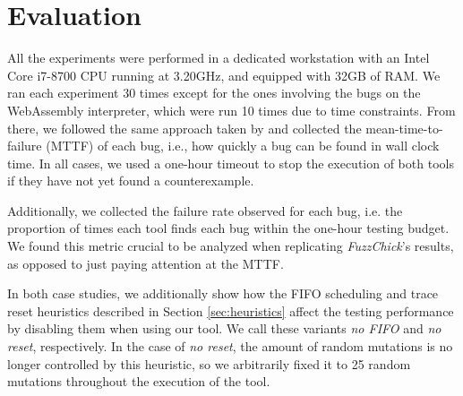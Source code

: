 \documentclass[acmsmall, anonymous]{acmart}
\newcommand{\fuzzchick}{\textit{FuzzChick}\xspace}
\begin{document}


\section{Evaluation}
\label{sec:evaluation}

All the experiments were performed in a dedicated workstation with an Intel Core
i7-8700 CPU running at 3.20GHz, and equipped with 32GB of RAM.
%
We ran each experiment 30 times except for the ones involving the bugs on the
WebAssembly interpreter, which were run 10 times due to time constraints.
%
From there, we followed the same approach taken by
\citeauthor{lampropoulos2019coverage} and collected the mean-time-to-failure
(MTTF) of each bug, i.e., how quickly a bug can be found in wall clock time.
%
In all cases, we used a one-hour timeout to stop the execution of both tools if
they have not yet found a counterexample.

Additionally, we collected the failure rate observed for each bug, i.e. the
proportion of times each tool finds each bug within the one-hour testing budget.
%
We found this metric crucial to be analyzed when replicating \fuzzchick's
results, as opposed to just paying attention at the MTTF.

In both case studies, we additionally show how the FIFO scheduling and trace
reset heuristics described in Section \ref{sec:heuristics} affect the testing
performance by disabling them when using our tool.
%
We call these variants \textit{no FIFO} and \textit{no reset}, respectively.
%
In the case of \textit{no reset}, the amount of random mutations is no longer
controlled by this heuristic, so we arbitrarily fixed it to 25 random mutations
throughout the execution of the tool.
\end{document}
